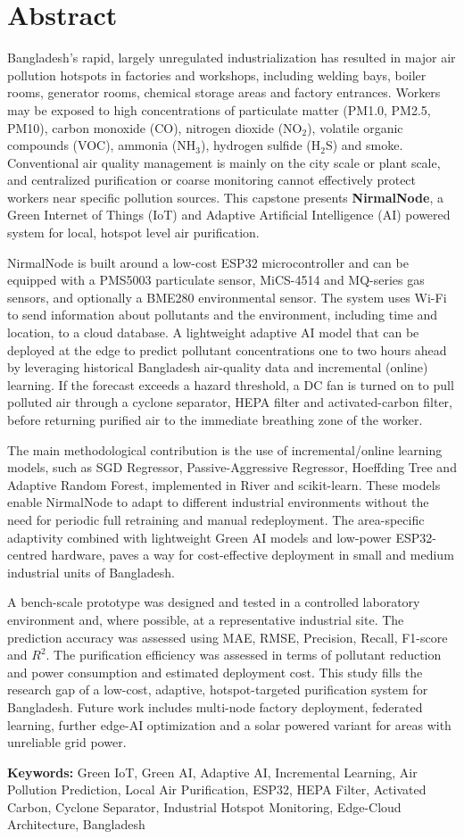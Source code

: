 \chapter*{Abstract}
Bangladesh’s rapid, largely unregulated industrialization has resulted in major air pollution hotspots in factories and workshops, including welding bays, boiler rooms, generator rooms, chemical storage areas and factory entrances. Workers may be exposed to high concentrations of particulate matter (PM1.0, PM2.5, PM10), carbon monoxide (CO), nitrogen dioxide (NO$_2$), volatile organic compounds (VOC), ammonia (NH$_3$), hydrogen sulfide (H$_2$S) and smoke. Conventional air quality management is mainly on the city scale or plant scale, and centralized purification or coarse monitoring cannot effectively protect workers near specific pollution sources. This capstone presents \textbf{NirmalNode}, a Green Internet of Things (IoT) and Adaptive Artificial Intelligence (AI) powered system for local, hotspot level air purification.

NirmalNode is built around a low-cost ESP32 microcontroller and can be equipped with a PMS5003 particulate sensor, MiCS-4514 and MQ-series gas sensors, and optionally a BME280 environmental sensor. The system uses Wi-Fi to send information about pollutants and the environment, including time and location, to a cloud database. A lightweight adaptive AI model that can be deployed at the edge to predict pollutant concentrations one to two hours ahead by leveraging historical Bangladesh air-quality data and incremental (online) learning. If the forecast exceeds a hazard threshold, a DC fan is turned on to pull polluted air through a cyclone separator, HEPA filter and activated-carbon filter, before returning purified air to the immediate breathing zone of the worker.

The main methodological contribution is the use of incremental/online learning models, such as SGD Regressor, Passive-Aggressive Regressor, Hoeffding Tree and Adaptive Random Forest, implemented in River and scikit-learn. These models enable NirmalNode to adapt to different industrial environments without the need for periodic full retraining and manual redeployment. The area-specific adaptivity combined with lightweight Green AI models and low-power ESP32-centred hardware, paves a way for cost-effective deployment in small and medium industrial units of Bangladesh.

A bench-scale prototype was designed and tested in a controlled laboratory environment and, where possible, at a representative industrial site. The prediction accuracy was assessed using MAE, RMSE, Precision, Recall, F1-score and $R^2$. The purification efficiency was assessed in terms of pollutant reduction and power consumption and estimated deployment cost. This study fills the research gap of a low-cost, adaptive, hotspot-targeted purification system for Bangladesh. Future work includes multi-node factory deployment, federated learning, further edge-AI optimization and a solar powered variant for areas with unreliable grid power.

\vspace{0.5cm}
\textbf{Keywords:} Green IoT, Green AI, Adaptive AI, Incremental Learning, Air Pollution Prediction, Local Air Purification, ESP32, HEPA Filter, Activated Carbon, Cyclone Separator, Industrial Hotspot Monitoring, Edge-Cloud Architecture, Bangladesh
